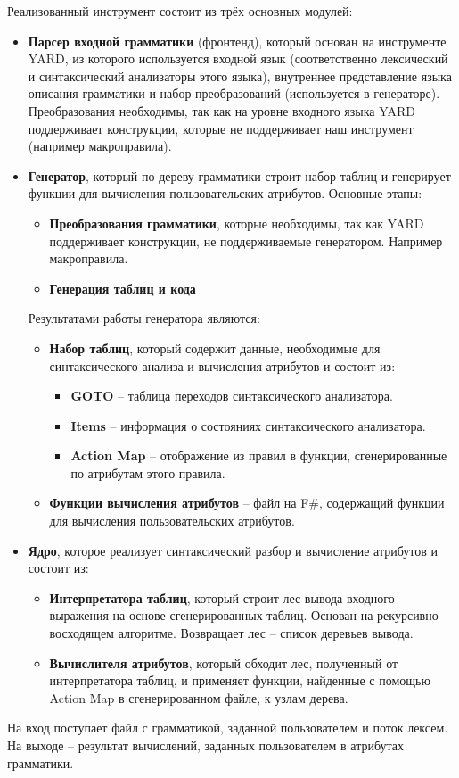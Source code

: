 Реализованный инструмент состоит из трёх основных модулей:
\begin{itemize}
	\item {\bfseries Парсер входной грамматики} (фронтенд), который основан на инструменте YARD, из которого используется входной язык (соответственно лексический и синтаксический анализаторы этого языка), внутреннее представление языка описания грамматики и набор преобразований (используется в генераторе). Преобразования необходимы, так как на уровне входного языка YARD поддерживает конструкции, которые не поддерживает наш инструмент (например макроправила).
	
	\item {\bfseries Генератор}, который по дереву грамматики строит набор таблиц и генерирует функции для вычисления пользовательских атрибутов. Основные этапы:
		\begin{itemize}
			\item {\bfseries Преобразования грамматики}, которые необходимы, так как YARD поддерживает конструкции, не поддерживаемые генератором. Например макроправила.
				\item {\bfseries Генерация таблиц и кода}
		\end{itemize}
		Результатами работы генератора являются:
		\begin{itemize}
			\item {\bfseries Набор таблиц}, который содержит данные, необходимые для синтаксического анализа и вычисления атрибутов и состоит из:
			\begin{itemize}
				\item {\bfseries GOTO} -- таблица переходов синтаксического анализатора.
		  	\item {\bfseries Items} -- информация о состояниях  синтаксического анализатора.
		  	\item {\bfseries Action Map} -- отображение из правил в функции,  сгенерированные по атрибутам этого правила.
			\end{itemize}
			
		  \item {\bfseries Функции вычисления атрибутов } -- файл на F\#, содержащий функции для вычисления пользовательских атрибутов.
		\end{itemize}
		
		
	\item {\bfseries Ядро}, которое реализует синтаксический разбор и вычисление атрибутов и состоит из:
		\begin{itemize}
			\item {\bfseries Интерпретатора таблиц}, который строит лес вывода входного выражения на основе сгенерированных таблиц. Основан на рекурсивно-восходящем алгоритме. Возвращает лес -- список деревьев вывода.
			\item {\bfseries Вычислителя атрибутов}, который обходит лес, полученный от интерпретатора таблиц, и применяет функции, найденные с помощью Action Map в сгенерированном файле, к узлам дерева.
		\end{itemize}
		
\end{itemize}

На вход поступает файл с грамматикой, заданной пользователем и поток лексем. На выходе -- результат вычислений, заданных пользователем в атрибутах грамматики.
